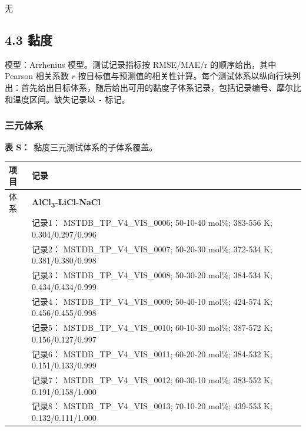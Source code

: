 \documentclass[12pt]{article}
\providecommand{\passthrough}[1]{#1}
\renewcommand{\thetable}{S\arabic{table}}
\newcommand{\sitablecaption}[1]{\Needspace{12\baselineskip}\par\noindent\stepcounter{table}\textbf{表 \thetable：}~#1\par\nobreak\smallskip}
\newcommand{\silongtablecaption}[1]{\sitablecaption{#1}\addtocounter{table}{-1}}
\begin{document}
无

\subsection*{4.3 黏度}\label{viscosity}

模型：Arrhenius 模型。测试记录指标按 RMSE/MAE/r 的顺序给出，其中 Pearson 相关系数 \(r\) 按目标值与预测值的相关性计算。每个测试体系以纵向行块列出：首先给出目标体系，随后给出可用的黏度子体系记录，包括记录编号、摩尔比和温度区间。缺失记录以 \passthrough{\lstinline!-!} 标记。

\subsubsection*{三元体系}\label{ternary-system-4}

{
\silongtablecaption{黏度三元测试体系的子体系覆盖。}
\begin{longtable}[]{@{}
  >{\raggedright\arraybackslash}p{}
  >{\raggedright\arraybackslash}p{}@{}}
\toprule\noalign{}
\begin{minipage}[b]{\linewidth}\raggedright
项目
\end{minipage} & \begin{minipage}[b]{\linewidth}\raggedright
记录
\end{minipage} \\
\midrule\noalign{}
\endhead
\bottomrule\noalign{}
\endlastfoot
体系 & \textbf{AlCl\textsubscript{3}-LiCl-NaCl} \\
 & 记录1： MSTDB\_TP\_V4\_VIS\_0006; 50-10-40 mol\%; 383-556 K; 0.304/0.297/0.996 \\
 & 记录2： MSTDB\_TP\_V4\_VIS\_0007; 50-20-30 mol\%; 372-534 K; 0.381/0.380/0.998 \\
 & 记录3： MSTDB\_TP\_V4\_VIS\_0008; 50-30-20 mol\%; 384-534 K; 0.434/0.434/0.999 \\
 & 记录4： MSTDB\_TP\_V4\_VIS\_0009; 50-40-10 mol\%; 424-574 K; 0.456/0.455/0.998 \\
 & 记录5： MSTDB\_TP\_V4\_VIS\_0010; 60-10-30 mol\%; 387-572 K; 0.156/0.127/0.997 \\
 & 记录6： MSTDB\_TP\_V4\_VIS\_0011; 60-20-20 mol\%; 384-532 K; 0.151/0.133/0.999 \\
 & 记录7： MSTDB\_TP\_V4\_VIS\_0012; 60-30-10 mol\%; 383-552 K; 0.191/0.158/1.000 \\
 & 记录8： MSTDB\_TP\_V4\_VIS\_0013; 70-10-20 mol\%; 439-553 K; 0.132/0.111/1.000 \\

\end{longtable}}
\end{document}
